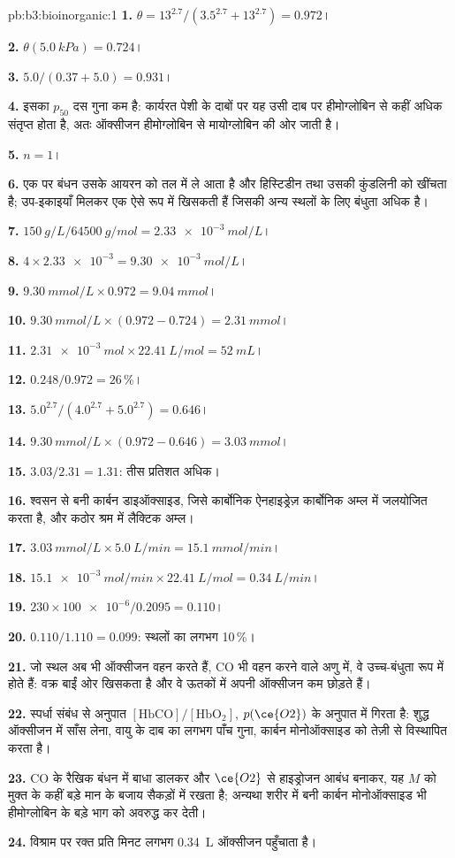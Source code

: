 \begin{solution}{pb:b3:bioinorganic:1}
\textbf{1.} $\theta = 13^{2.7}/(3.5^{2.7} + 13^{2.7}) = 0.972$।

\textbf{2.} $\theta(\qty{5.0}{kPa}) = 0.724$।

\textbf{3.} $5.0/(0.37 + 5.0) = 0.931$।

\textbf{4.} इसका $p_{50}$ दस गुना कम है: कार्यरत पेशी के दाबों पर यह उसी दाब पर हीमोग्लोबिन से कहीं अधिक
संतृप्त होता है, अतः ऑक्सीजन
हीमोग्लोबिन से मायोग्लोबिन की ओर जाती है।

\textbf{5.} $n = 1$।

\textbf{6.} एक  पर बंधन उसके आयरन को तल में ले आता है और हिस्टिडीन तथा
उसकी कुंडलिनी को खींचता है; उप-इकाइयाँ मिलकर एक ऐसे रूप में खिसकती हैं जिसकी
अन्य स्थलों के लिए बंधुता अधिक है।

\textbf{7.} $\qty{150}{g/L}/\qty{64500}{g/mol} = \qty{2.33e-3}{mol/L}$।

\textbf{8.} $4 \times \num{2.33e-3} = \qty{9.30e-3}{mol/L}$।

\textbf{9.} $\qty{9.30}{mmol/L} \times 0.972 = \qty{9.04}{mmol}$।

\textbf{10.} $\qty{9.30}{mmol/L} \times (0.972 - 0.724) = \qty{2.31}{mmol}$।

\textbf{11.} $\qty{2.31e-3}{mol} \times \qty{22.41}{L/mol} = \qty{52}{mL}$।

\textbf{12.} $0.248/0.972 = 26$\,\%।

\textbf{13.} $5.0^{2.7}/(4.0^{2.7} + 5.0^{2.7}) = 0.646$।

\textbf{14.} $\qty{9.30}{mmol/L} \times (0.972 - 0.646) = \qty{3.03}{mmol}$।

\textbf{15.} $3.03/2.31 = 1.31$: तीस प्रतिशत अधिक।

\textbf{16.} श्वसन से बनी कार्बन डाइऑक्साइड, जिसे कार्बोनिक ऐनहाइड्रेज़
कार्बोनिक अम्ल में जलयोजित करता है, और कठोर श्रम में लैक्टिक अम्ल।

\textbf{17.} $\qty{3.03}{mmol/L} \times \qty{5.0}{L/min} = \qty{15.1}{mmol/min}$।

\textbf{18.} $\qty{15.1e-3}{mol/min} \times \qty{22.41}{L/mol} = \qty{0.34}{L/min}$।

\textbf{19.} $230 \times \num{100e-6}/0.2095 = 0.110$।

\textbf{20.} $0.110/1.110 = 0.099$: स्थलों का लगभग 10\,\%।

\textbf{21.} जो स्थल अब भी ऑक्सीजन वहन करते हैं, CO भी वहन करने वाले अणु में, वे
उच्च-बंधुता रूप में होते हैं: वक्र बाईं ओर खिसकता है और वे ऊतकों में अपनी
ऑक्सीजन कम छोड़ते हैं।

\textbf{22.} स्पर्धा संबंध से अनुपात $[\mathrm{HbCO}]/[\mathrm{HbO_2}]$, $p(\ce{O2})$ के अनुपात में गिरता है:
शुद्ध ऑक्सीजन में साँस लेना, वायु के दाब का लगभग पाँच गुना, कार्बन
मोनोऑक्साइड को तेज़ी से विस्थापित करता है।

\textbf{23.} CO के रैखिक बंधन में बाधा डालकर और $\ce{O2}$ से हाइड्रोजन आबंध बनाकर, यह $M$ को
मुक्त  के कहीं बड़े मान के बजाय सैकड़ों में रखता है; अन्यथा शरीर में बनी
कार्बन मोनोऑक्साइड भी हीमोग्लोबिन के बड़े भाग को अवरुद्ध कर देती।

\textbf{24.} विश्राम पर रक्त प्रति मिनट लगभग \qty{0.34}{L} ऑक्सीजन पहुँचाता है।
\end{solution}
